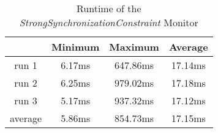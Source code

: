 	\begin{table}
		\begin{tabular}{|c|c|c|c|}
			\hline
					& Minimum & Maximum & Average \\
			\hline
			run 1	& 6.17ms & 647.86ms & 17.14ms \\
			\hline
			run 2	& 6.25ms & 979.02ms & 17.18ms\\
			\hline
			run 3	& 5.17ms & 937.32ms & 17.12ms\\
			\hline
			average & 5.86ms & 854.73ms & 17.15ms\\
			\hline
		\end{tabular}
		\centering
		\label{tab:runtimeStrongSynchronizationConstraint}
		\caption{Runtime of the \emph{StrongSynchronizationConstraint} Monitor}
	\end{table}
	
